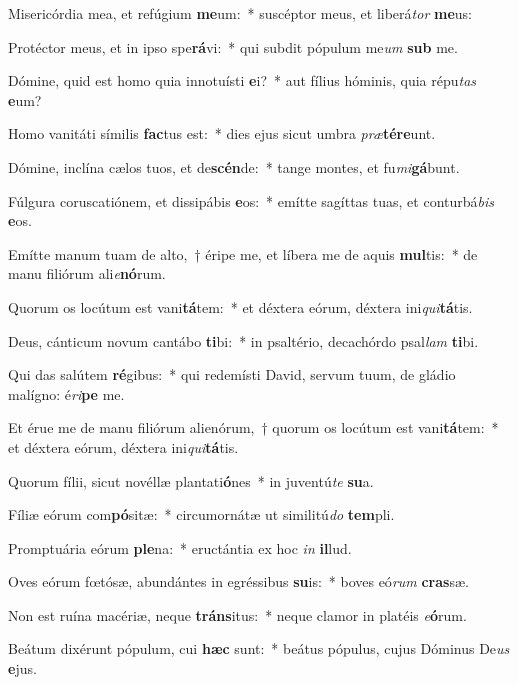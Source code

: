 \item Misericórdia mea, et refúgium \textbf{me}um:~* suscéptor meus, et liberá\textit{tor} \textbf{me}us:
\item Protéctor meus, et in ipso spe\textbf{rá}vi:~* qui subdit pópulum me\textit{um} \textbf{sub} me.
\item Dómine, quid est homo quia innotuísti \textbf{e}i?~* aut fílius hóminis, quia répu\textit{tas} \textbf{e}um?
\item Homo vanitáti símilis \textbf{fac}tus est:~* dies ejus sicut umbra \textit{præ}\textbf{tér}\textbf{e}unt.
\item Dómine, inclína cælos tuos, et de\textbf{scén}de:~* tange montes, et fu\textit{mi}\textbf{gá}bunt.
\item Fúlgura coruscatiónem, et dissipábis \textbf{e}os:~* emítte sagíttas tuas, et conturbá\textit{bis} \textbf{e}os.
\item Emítte manum tuam de alto,~† éripe me, et líbera me de aquis \textbf{mul}tis:~* de manu filiórum ali\textit{e}\textbf{nó}rum.
\item Quorum os locútum est vani\textbf{tá}tem:~* et déxtera eórum, déxtera ini\textit{qui}\textbf{tá}tis.
\item Deus, cánticum novum cantábo \textbf{ti}bi:~* in psaltério, decachórdo psal\textit{lam} \textbf{ti}bi.
\item Qui das salútem \textbf{ré}gibus:~* qui redemísti David, servum tuum, de gládio malígno: é\textit{ri}\textbf{pe} me.
\item Et érue me de manu filiórum alienórum,~† quorum os locútum est vani\textbf{tá}tem:~* et déxtera eórum, déxtera ini\textit{qui}\textbf{tá}tis.
\item Quorum fílii, sicut novéllæ plantati\textbf{ó}nes~* in juventú\textit{te} \textbf{su}a.
\item Fíliæ eórum com\textbf{pó}sitæ:~* circumornátæ ut similitú\textit{do} \textbf{tem}pli.
\item Promptuária eórum \textbf{ple}na:~* eructántia ex hoc \textit{in} \textbf{il}lud.
\item Oves eórum fœtósæ, abundántes in egréssibus \textbf{su}is:~* boves eó\textit{rum} \textbf{cras}sæ.
\item Non est ruína macériæ, neque \textbf{tráns}itus:~* neque clamor in platéis \textit{e}\textbf{ó}rum.
\item Beátum dixérunt pópulum, cui \textbf{hæc} sunt:~* beátus pópulus, cujus Dóminus De\textit{us} \textbf{e}jus.
